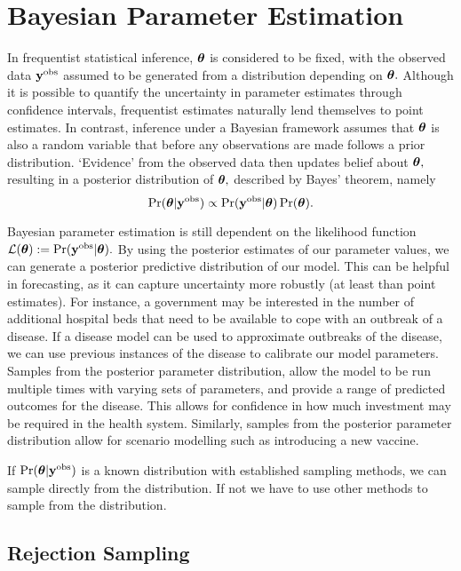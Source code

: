 \section{Bayesian Parameter Estimation}

In frequentist statistical inference, $\bm{\theta}$ is considered to be
fixed, with the observed data $\mathbf{y}^{\mathrm{obs}}$ assumed to be
generated from a distribution depending on $\bm{\theta}.$ Although it is possible
to quantify the uncertainty in parameter estimates through confidence intervals,
frequentist estimates naturally lend themselves to point estimates.
In contrast, inference under a Bayesian
framework assumes that $\bm{\theta}$ is also a random variable that before any
observations are made follows a
prior distribution. `Evidence' from the observed data then updates
belief about
$\bm{\theta},$ resulting in a posterior distribution of $\bm{\theta},$ described by
Bayes' theorem, namely
$$
    \Pr(\bm{\theta}|\mathbf{y}^{\mathrm{obs}}) \propto \Pr(\mathbf{y}^{\mathrm{obs}}|\bm{\theta})\Pr(\bm{\theta}).
$$

Bayesian parameter estimation is still dependent on the likelihood function
$\mathcal{L}(\bm{\theta}) := \Pr(\mathbf{y}^{\mathrm{obs}}|\bm{\theta}).$
By using the posterior estimates of our parameter values, we can generate a
posterior predictive distribution of our model. This can be helpful in 
forecasting, as it can capture uncertainty more robustly (at least than point
estimates).
For instance, a government may be interested in the number of additional
hospital beds that need to be available to cope with an outbreak of a disease.
If a disease model can be used to approximate outbreaks of the disease,
we can use previous instances of the disease to calibrate our model parameters.
Samples from the posterior parameter distribution, allow
the model to be run multiple times with varying sets of parameters,
and provide a range of predicted outcomes for the disease. This allows for
confidence in how much investment may be required in the health system.
Similarly, samples from the posterior parameter distribution allow for scenario
modelling such as introducing a new vaccine.

If $\Pr(\bm{\theta} | \mathbf{y}^{\mathrm{obs}})$ is a known distribution with established
sampling methods, we can sample directly from the distribution. If not we
have to use other methods to sample from the distribution.

\subsection*{Rejection Sampling}

